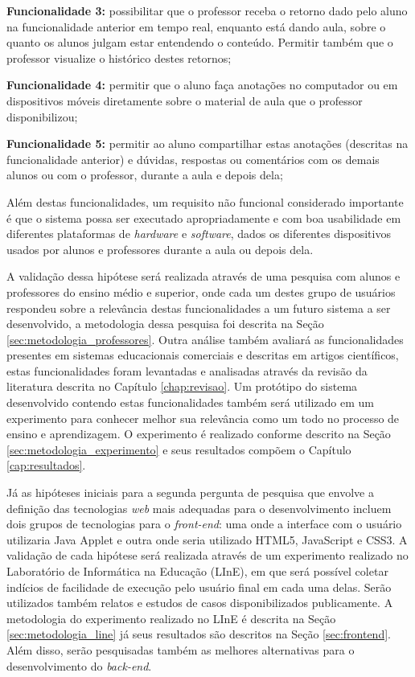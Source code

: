 \textbf{Funcionalidade 3:} possibilitar que o professor receba o retorno dado pelo aluno na funcionalidade anterior em tempo real, enquanto está dando aula, sobre o quanto os alunos julgam estar entendendo o conteúdo. Permitir também que o professor visualize o histórico destes retornos;

\textbf{Funcionalidade 4:} permitir que o aluno faça anotações no computador ou em dispositivos móveis diretamente sobre o material de aula que o professor disponibilizou;

\textbf{Funcionalidade 5:} permitir ao aluno compartilhar estas anotações (descritas na funcionalidade anterior) e dúvidas, respostas ou comentários com os demais alunos ou com o professor, durante a aula e depois dela;

Além destas funcionalidades, um requisito não funcional considerado importante é que o sistema possa ser executado apropriadamente e com boa usabilidade em diferentes plataformas de \emph{hardware} e \emph{software}, dados os diferentes dispositivos usados por alunos e professores durante a aula ou depois dela.

A validação dessa hipótese será realizada através de uma pesquisa com alunos e professores do ensino médio e superior, onde cada um destes grupo de usuários respondeu sobre a relevância destas funcionalidades a um futuro sistema a ser desenvolvido, a metodologia dessa pesquisa foi descrita na Seção \ref{sec:metodologia_professores}. Outra análise também avaliará as funcionalidades presentes em sistemas educacionais comerciais e descritas em artigos científicos, estas funcionalidades foram levantadas e analisadas através da revisão da literatura descrita no Capítulo \ref{chap:revisao}. Um protótipo do sistema desenvolvido contendo estas funcionalidades também será utilizado em um experimento para conhecer melhor sua relevância como um todo no processo de ensino e aprendizagem. O experimento é realizado conforme descrito na Seção \ref{sec:metodologia_experimento} e seus resultados compõem o Capítulo \ref{cap:resultados}.

Já as hipóteses iniciais para a segunda pergunta de pesquisa que envolve a definição das tecnologias \emph{web} mais adequadas para o desenvolvimento incluem dois grupos de tecnologias para o \emph{front-end}: uma onde a interface com o usuário utilizaria Java Applet e outra onde seria utilizado HTML5, JavaScript e CSS3. A validação de cada hipótese será realizada através de um experimento realizado no Laboratório de Informática na Educação (LInE), em que será possível coletar indícios de facilidade de execução pelo usuário final em cada uma delas. Serão utilizados também relatos e estudos de casos disponibilizados publicamente. A metodologia do experimento realizado no LInE é descrita na Seção \ref{sec:metodologia_line} já seus resultados são descritos na Seção \ref{sec:frontend}. Além disso, serão pesquisadas também as melhores alternativas para o desenvolvimento do \emph{back-end}.

